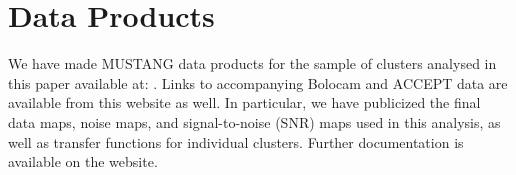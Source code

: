 \documentclass[iop,numberedappendix,apj]{emulateapj}
\begin{document}
\section{Data Products}

We have made MUSTANG data products for the sample of clusters analysed in this paper available at: 
. Links to accompanying
Bolocam and ACCEPT data are available from this website as well. In particular, we have publicized the final
data maps, noise maps, and signal-to-noise (SNR) maps used in this analysis, as well as transfer functions
for individual clusters. Further documentation is available on the website.





\label{references}
\end{document}
